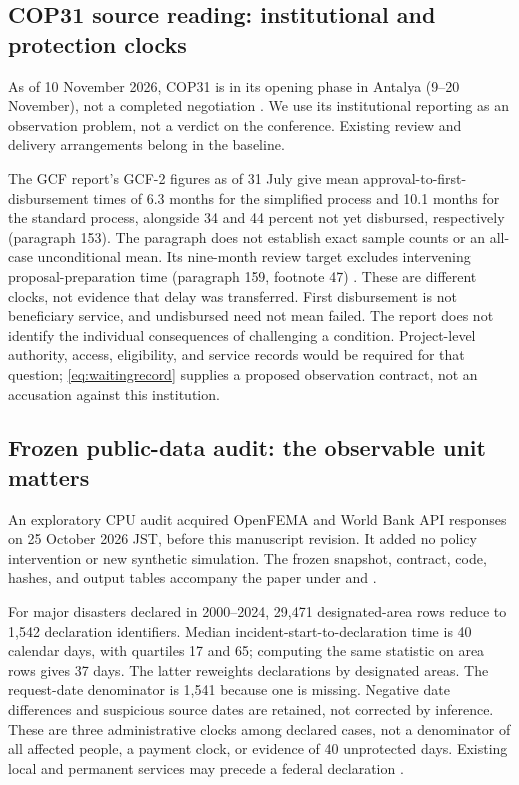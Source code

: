 \documentclass[11pt,a4paper]{article}
\numberwithin{equation}{section}
\theoremstyle{definition}
\theoremstyle{plain}
\theoremstyle{remark}
\begin{document}
\subsection{COP31 source reading: institutional and protection clocks}
\label{sec:cop31}

As of 10 November 2026, COP31 is in its opening phase in Antalya (9--20 November), not a completed negotiation \citep{unfccc2026cop31}. We use its institutional reporting as an observation problem, not a verdict on the conference. Existing review and delivery arrangements belong in the baseline.

The GCF report's GCF-2 figures as of 31 July give mean approval-to-first-disbursement times of 6.3 months for the simplified process and 10.1 months for the standard process, alongside 34 and 44 percent not yet disbursed, respectively (paragraph 153). The paragraph does not establish exact sample counts or an all-case unconditional mean. Its nine-month review target excludes intervening proposal-preparation time (paragraph 159, footnote 47) \citep{gcf2026report}. These are different clocks, not evidence that delay was transferred. First disbursement is not beneficiary service, and undisbursed need not mean failed. The report does not identify the individual consequences of challenging a condition. Project-level authority, access, eligibility, and service records would be required for that question; \cref{eq:waitingrecord} supplies a proposed observation contract, not an accusation against this institution.

\subsection{Frozen public-data audit: the observable unit matters}
\label{sec:descriptive}

An exploratory CPU audit acquired OpenFEMA and World Bank API responses on 25 October 2026 JST, before this manuscript revision. It added no policy intervention or new synthetic simulation. The frozen snapshot, contract, code, hashes, and output tables accompany the paper under  and .

For major disasters declared in 2000--2024, 29,471 designated-area rows reduce to 1,542 declaration identifiers. Median incident-start-to-declaration time is 40 calendar days, with quartiles 17 and 65; computing the same statistic on area rows gives 37 days. The latter reweights declarations by designated areas. The request-date denominator is 1,541 because one is missing. Negative date differences and suspicious source dates are retained, not corrected by inference. These are three administrative clocks among declared cases, not a denominator of all affected people, a payment clock, or evidence of 40 unprotected days. Existing local and permanent services may precede a federal declaration \citep{fema2026data}.
\end{document}
